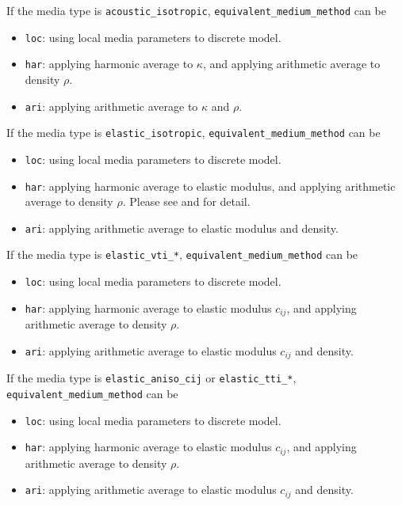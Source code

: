 If the media type is \texttt{acoustic\_isotropic}, \texttt{equivalent\_medium\_method} can be
\begin{itemize}
 \item \texttt{loc}: using local media parameters to discrete model. 
 \item \texttt{har}: applying harmonic average to $\kappa$, and applying arithmetic average to density $\rho$. 
 \item \texttt{ari}: applying arithmetic average to $\kappa$ and $\rho$. 
\end{itemize}

If the media type is \texttt{elastic\_isotropic}, \texttt{equivalent\_medium\_method} can be
\begin{itemize}
 \item \texttt{loc}: using local media parameters to discrete model. 
 \item \texttt{har}: applying harmonic average to elastic modulus, and applying arithmetic average to density $\rho$. Please see \citet{moczo_3d_2002} and \citep{moczo_finite-difference_2014} for detail.
 \item \texttt{ari}: applying arithmetic average to elastic modulus and density. 
\end{itemize}

If the media type is \texttt{elastic\_vti\_*}, \texttt{equivalent\_medium\_method} can be
\begin{itemize}
 \item \texttt{loc}: using local media parameters to discrete model. 
 \item \texttt{har}: applying harmonic average to elastic modulus $c_{ij}$, and applying arithmetic average to density $\rho$.
 \item \texttt{ari}: applying arithmetic average to elastic modulus $c_{ij}$ and density. 
\end{itemize}

If the media type is \texttt{elastic\_aniso\_cij} or \texttt{elastic\_tti\_*}, \texttt{equivalent\_medium\_method} can be
\begin{itemize}
 \item \texttt{loc}: using local media parameters to discrete model. 
 \item \texttt{har}: applying harmonic average to elastic modulus $c_{ij}$, and applying arithmetic average to density $\rho$.
 \item \texttt{ari}: applying arithmetic average to elastic modulus $c_{ij}$ and density. 
\end{itemize}